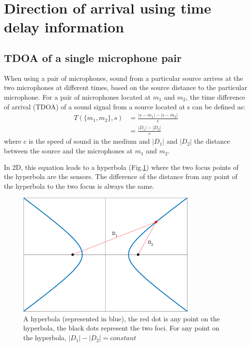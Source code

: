 \section{Direction of arrival using time delay information}
\subsection{TDOA of a single microphone pair}\label{sec:TDOA}

When using a pair of microphones, sound from a particular source arrives at the two microphones at different times, based on the source distance to the particular microphone. For a pair of microphones located at $m_{1}$ and $m_{2}$, the time difference of arrival (TDOA) of a sound signal from a source located at s can be defined as:
\begin{equation}
    \begin{split}
    T(\{m_{1},m_{2}\},s)&=\frac{|s-m_{1}|-|s-m_{2}|}{c}\\
                        &=\frac{|D_{1}|-|D_{2}|}{c}
    \label{eq:tdoa}
    \end{split}
\end{equation}
where c is the speed of sound in the medium and $|D_{1}|$ and $|D_{2}|$ the distance between the source and the microphones at $m_1$ and $m_2$.

In 2D, this equation leads to a hyperbola (Fig.\ref{eq:tdoa}) where the two focus points of the hyperbola are the sensors. The difference of the distance from any point of the hyperbola to the two focus is always the same.

\begin{figure}[H]
    \centering
    \includegraphics[width=0.8\textwidth]{Figures/hyperbola.png}
    \caption{A hyperbola (represented in blue), the red dot is any point on the hyperbola, the black dots represent the two foci. For any point on the hyperbola, $|D_1|-|D_2| = constant$}
    \label{eq:tdoa}
\end{figure}

